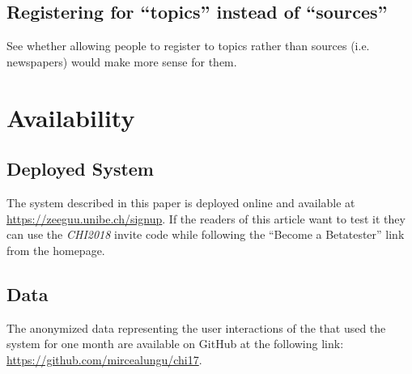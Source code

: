 \subsection{Registering for ``topics'' instead of ``sources''}
See whether allowing people to register to topics rather than sources (i.e. newspapers) would make more sense for them. 




\section{Availability}

\subsection{Deployed System}
The system described in this paper is deployed online and available at \url{https://zeeguu.unibe.ch/signup}. If the readers of this article want to test it they can use the {\em CHI2018} invite code while following the  ``Become a Betatester'' link from the homepage.

\subsection{Data}
The anonymized data representing the user interactions of the \students that used the system for one month are available on GitHub at the following link: \url{https://github.com/mircealungu/chi17}.


